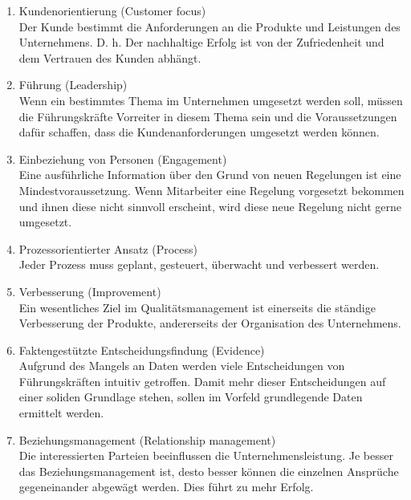 \documentclass[11pt]{scrartcl}       %
\begin{document}
\begin{enumerate}

\item Kundenorientierung (Customer focus) \\
Der Kunde bestimmt die Anforderungen an die Produkte und Leistungen des
Unternehmens. D. h. Der nachhaltige Erfolg ist von der Zufriedenheit und
dem Vertrauen des Kunden abhängt.

\item Führung (Leadership) \\
Wenn ein bestimmtes Thema im Unternehmen umgesetzt werden soll, müssen die Führungskräfte Vorreiter in diesem Thema sein und die
Voraussetzungen dafür schaffen, dass die Kundenanforderungen umgesetzt werden können.

\item Einbeziehung von Personen (Engagement) \\
Eine ausführliche Information über den Grund von neuen Regelungen ist eine Mindestvoraussetzung. Wenn Mitarbeiter eine Regelung vorgesetzt bekommen und ihnen diese nicht sinnvoll erscheint, wird diese neue Regelung nicht gerne umgesetzt.

\item Prozessorientierter Ansatz (Process) \\
Jeder Prozess muss geplant, gesteuert, überwacht und verbessert werden.

\item Verbesserung (Improvement) \\
Ein wesentliches Ziel im Qualitätsmanagement ist einerseits die ständige Verbesserung der Produkte, andererseits der Organisation des Unternehmens. 

\item Faktengestützte Entscheidungsfindung (Evidence) \\
Aufgrund des Mangels an Daten werden viele Entscheidungen von Führungskräften intuitiv getroffen. Damit mehr dieser Entscheidungen auf einer soliden Grundlage stehen, sollen im Vorfeld grundlegende Daten ermittelt werden. 

\item Beziehungsmanagement (Relationship management) \\
Die interessierten Parteien beeinflussen die Unternehmensleistung. Je besser das Beziehungsmanagement ist, desto besser können die einzelnen Ansprüche gegeneinander abgewägt werden. Dies führt zu mehr Erfolg.
\end{enumerate}
\end{document}
